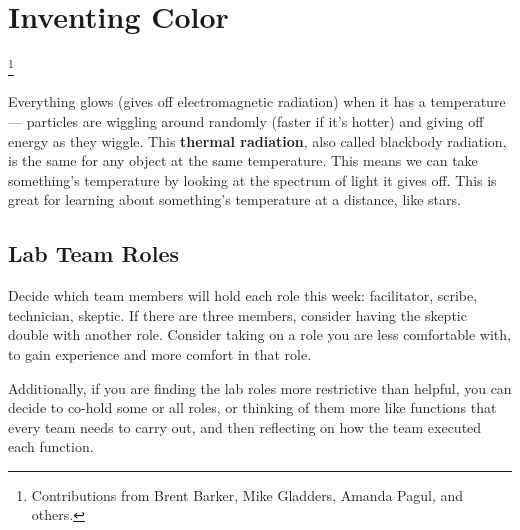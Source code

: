 \chapter{Inventing Color}\footnote{Contributions from Brent Barker, Mike Gladders, Amanda Pagul, and others.}




Everything glows (gives off electromagnetic radiation) when it has a temperature --- particles are wiggling around randomly (faster if it's hotter) and giving off energy as they wiggle. This \textbf{thermal radiation}, also called blackbody radiation, is the same for any object at the same temperature. This means we can take something's temperature by looking at the spectrum of light it gives off. This is great for learning about something's temperature at a distance, like stars.


\section{Lab Team Roles}

Decide which team members will hold each role this week: facilitator, scribe, technician, skeptic. If there are three members, consider having the skeptic double with another role. Consider taking on a role you are less comfortable with, to gain experience and more comfort in that role.

Additionally, if you are finding the lab roles more restrictive than helpful, you can decide to co-hold some or all roles, or thinking of them more like functions that every team needs to carry out, and then reflecting on how the team executed each function.

